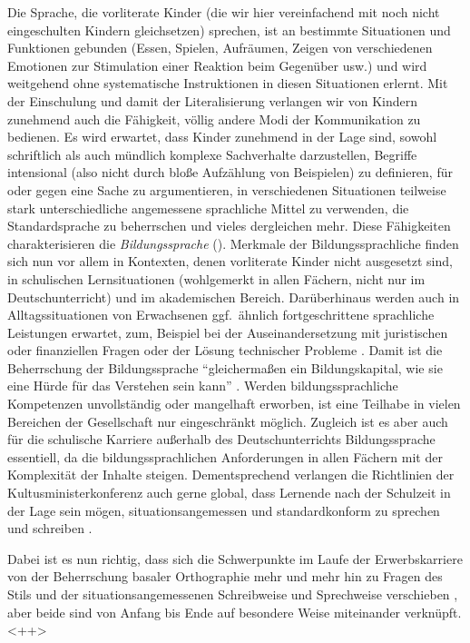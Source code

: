 Die Sprache, die vorliterate Kinder (die wir hier vereinfachend mit noch nicht eingeschulten Kindern gleichsetzen) sprechen, ist an bestimmte Situationen und Funktionen gebunden (Essen, Spielen, Aufräumen, Zeigen von verschiedenen Emotionen zur Stimulation einer Reaktion beim Gegenüber usw.) und wird weitgehend ohne systematische Instruktionen in diesen Situationen erlernt.
Mit der Einschulung und damit der Literalisierung verlangen wir von Kindern zunehmend auch die Fähigkeit, völlig andere Modi der Kommunikation zu bedienen.
Es wird erwartet, dass Kinder zunehmend in der Lage sind, sowohl schriftlich als auch mündlich komplexe Sachverhalte darzustellen, Begriffe intensional (also nicht durch bloße Aufzählung von Beispielen) zu definieren, für oder gegen eine Sache zu argumentieren, in verschiedenen Situationen teilweise stark unterschiedliche angemessene sprachliche Mittel zu verwenden, die Standardsprache zu beherrschen und vieles dergleichen mehr.
Diese Fähigkeiten charakterisieren die \textit{Bildungssprache} (\zB \citealt{Feilke2012}).
Merkmale der Bildungssprachliche finden sich nun vor allem in Kontexten, denen vorliterate Kinder nicht ausgesetzt sind, \zB in schulischen Lernsituationen (wohlgemerkt in allen Fächern, nicht nur im Deutschunterricht) und im akademischen Bereich.
Darüberhinaus werden auch in Alltagssituationen von Erwachsenen ggf.\ ähnlich fortgeschrittene sprachliche Leistungen erwartet, zum, Beispiel bei der Auseinandersetzung mit juristischen oder finanziellen Fragen oder der Lösung technischer Probleme \citep[5]{Feilke2012}.
Damit ist die Beherrschung der Bildungssprache "`gleichermaßen ein Bildungskapital, wie sie eine Hürde für das Verstehen sein kann"' \citep[11]{Feilke2012}.
Werden bildungssprachliche Kompetenzen unvollständig oder mangelhaft erworben, ist eine Teilhabe in vielen Bereichen der Gesellschaft nur eingeschränkt möglich.
Zugleich ist es aber auch für die schulische Karriere außerhalb des Deutschunterrichts Bildungssprache essentiell, da die bildungssprachlichen Anforderungen in allen Fächern mit der Komplexität der Inhalte steigen.
Dementsprechend verlangen die Richtlinien der Kultusministerkonferenz auch gerne global, dass Lernende nach der Schulzeit in der Lage sein mögen, situationsangemessen und standardkonform zu sprechen und schreiben \citep[6]{Eisenberg2004}.

Dabei ist es nun richtig, dass sich die Schwerpunkte im Laufe der Erwerbskarriere von der Beherrschung basaler Orthographie mehr und mehr hin zu Fragen des Stils und der situationsangemessenen Schreibweise und Sprechweise verschieben \citep[77]{Portmanntselikas2011}, aber beide sind von Anfang bis Ende auf besondere Weise miteinander verknüpft.
<++>




